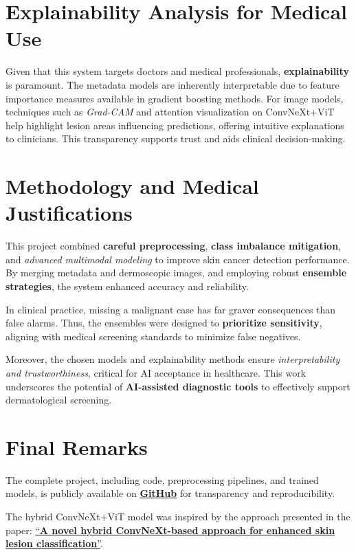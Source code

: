 \documentclass[11pt,a4paper]{article}
\begin{document}
\section{Explainability Analysis for Medical Use}

Given that this system targets doctors and medical professionals, \textbf{explainability} is paramount. The metadata models are inherently interpretable due to feature importance measures available in gradient boosting methods. For image models, techniques such as \textit{Grad-CAM} and attention visualization on ConvNeXt+ViT help highlight lesion areas influencing predictions, offering intuitive explanations to clinicians. This transparency supports trust and aids clinical decision-making.

\section{Methodology and Medical Justifications}

This project combined \textbf{careful preprocessing}, \textbf{class imbalance mitigation}, and \textit{advanced multimodal modeling} to improve skin cancer detection performance. By merging metadata and dermoscopic images, and employing robust \textbf{ensemble strategies}, the system enhanced accuracy and reliability.

In clinical practice, missing a malignant case has far graver consequences than false alarms. Thus, the ensembles were designed to \textbf{prioritize sensitivity}, aligning with medical screening standards to minimize false negatives.

Moreover, the chosen models and explainability methods ensure \textit{interpretability and trustworthiness}, critical for AI acceptance in healthcare. This work underscores the potential of \textbf{AI-assisted diagnostic tools} to effectively support dermatological screening.

\section{Final Remarks}

The complete project, including code, preprocessing pipelines, and trained models, is publicly available on \href{https://github.com/eduardferre/KaggleISIC}{\textbf{GitHub}} for transparency and reproducibility.

The hybrid ConvNeXt+ViT model was inspired by the approach presented in the paper: \href{https://www.sciencedirect.com/science/article/abs/pii/S0957417425013430}{``\textbf{A novel hybrid ConvNeXt-based approach for enhanced skin lesion classification}''}.
\end{document}
